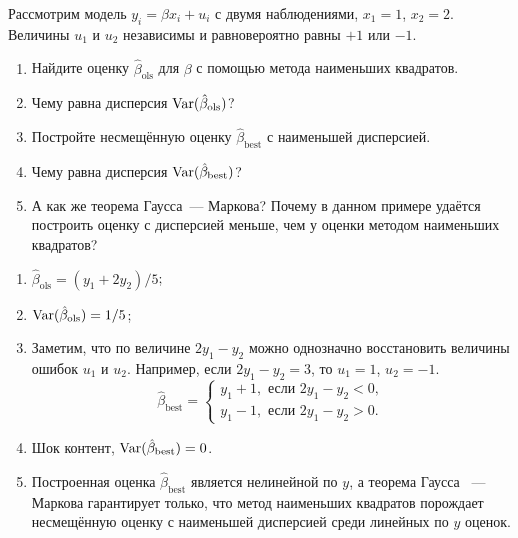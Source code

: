 \begin{problem}
Рассмотрим модель $y_i = \beta x_i + u_i$ с двумя наблюдениями, $x_1 = 1$, $x_2 = 2$.
Величины $u_1$ и $u_2$ независимы и равновероятно равны $+1$ или $-1$.

\begin{enumerate}
  \item Найдите оценку $\hat\beta_{\text{ols}}$ для $\beta$ с помощью метода наименьших квадратов. 
  \item Чему равна дисперсия $\operatorname{Var}(\hat\beta_{\text{ols}})$?
  \item Постройте несмещённую оценку $\hat\beta_{\text{best}}$ с наименьшей дисперсией. 
  \item Чему равна дисперсия $\operatorname{Var}(\hat\beta_{\text{best}})$?
  \item А как же теорема Гаусса~— Маркова? 
  Почему в данном примере удаётся построить оценку с дисперсией меньше, 
  чем у оценки методом наименьших квадратов?
\end{enumerate}
  \begin{sol}
    \begin{enumerate}
      \item $\hat\beta_{\text{ols}} = (y_1 + 2y_2)/5$;
      \item $\operatorname{Var}(\hat\beta_{\text{ols}}) = 1/5$;
      \item Заметим, что по величине $2y_1 - y_2$ можно однозначно восстановить величины ошибок $u_1$ и $u_2$.
      Например, если $2y_1 -y_2 = 3$, то $u_1 = 1$, $u_2 = -1$.
      \[
        \hat\beta_{\text{best}} = \begin{cases}
          y_1 + 1, \text{ если } 2y_1 - y_2 < 0,\\
          y_1 - 1, \text{ если } 2y_1 - y_2 >0.
        \end{cases}
      \]
      \item Шок контент, $\operatorname{Var}(\hat\beta_{\text{best}}) = 0$.
      \item Построенная оценка $\hat\beta_{\text{best}}$ является нелинейной по $y$, 
      а теорема Гаусса ~— Маркова гарантирует только, что метод наименьших квадратов 
      порождает несмещённую оценку с наименьшей дисперсией среди линейных по $y$ оценок. 
    \end{enumerate}
        
  \end{sol}
\end{problem}





